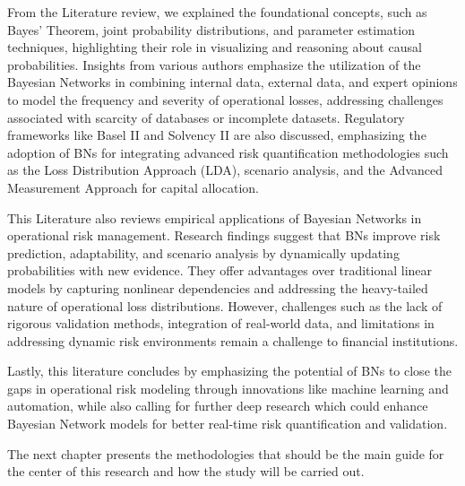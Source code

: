 From the Literature review, we explained the foundational concepts, such as Bayes' Theorem, joint probability distributions, and parameter estimation techniques, highlighting their role in visualizing and reasoning about causal probabilities. Insights from various authors emphasize the utilization of the Bayesian Networks in combining internal data, external data, and expert opinions to model the frequency and severity of operational losses, addressing challenges associated with scarcity of databases or incomplete datasets. Regulatory frameworks like Basel II and Solvency II are also discussed, emphasizing the adoption of BNs for integrating advanced risk quantification methodologies such as the Loss Distribution Approach (LDA), scenario analysis, and the Advanced Measurement Approach for capital allocation.

This Literature also reviews empirical applications of Bayesian Networks in operational risk management. Research findings suggest that BNs improve risk prediction, adaptability, and scenario analysis by dynamically updating probabilities with new evidence. They offer advantages over traditional linear models by capturing nonlinear dependencies and addressing the heavy-tailed nature of operational loss distributions. However, challenges such as the lack of rigorous validation methods, integration of real-world data, and limitations in addressing dynamic risk environments remain a challenge to financial institutions. 

Lastly, this literature concludes by emphasizing the potential of BNs to close the gaps in operational risk modeling through innovations like machine learning and automation, while also calling for further deep research which could enhance Bayesian Network models for better real-time risk quantification and validation.

The next chapter presents the methodologies that should be the main guide for the center of this research and how the study will be carried out. 
